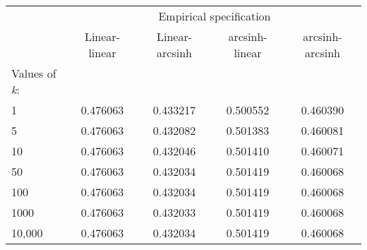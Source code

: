 {
\def\sym#1{\ifmmode^{#1}\else\(^{#1}\)\fi}
\begin{tabular}{l*{4}{c}}
\hline\hline
                &\multicolumn{4}{c}{Empirical specification}                                \\\cmidrule(lr){2-5}
                &\multicolumn{1}{c}{Linear-linear}&\multicolumn{1}{c}{Linear-arcsinh}&\multicolumn{1}{c}{arcsinh-linear}&\multicolumn{1}{c}{arcsinh-arcsinh}\\
\hline
\hline
Values of \textit{k}:&                  &                  &                  &                  \\
1               & 0.476063         & 0.433217         & 0.500552         & 0.460390         \\
5               & 0.476063         & 0.432082         & 0.501383         & 0.460081         \\
10              & 0.476063         & 0.432046         & 0.501410         & 0.460071         \\
50              & 0.476063         & 0.432034         & 0.501419         & 0.460068         \\
100             & 0.476063         & 0.432034         & 0.501419         & 0.460068         \\
1000            & 0.476063         & 0.432033         & 0.501419         & 0.460068         \\
10,000          & 0.476063         & 0.432034         & 0.501419         & 0.460068         \\
\hline\hline
\end{tabular}
}

